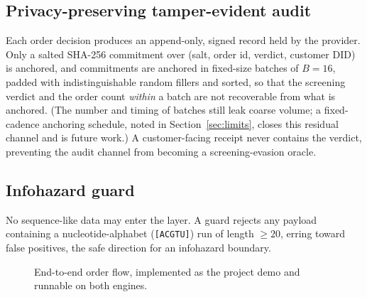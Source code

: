 \documentclass[conference]{IEEEtran}
\begin{document}
\subsection{Privacy-preserving tamper-evident audit}
Each order decision produces an append-only, signed record held by the provider. Only a salted
SHA-256 commitment over (salt, order id, verdict, customer DID) is anchored, and commitments are
anchored in fixed-size batches of $B=16$, padded with indistinguishable random fillers and
sorted, so that the screening verdict and the order count \textit{within} a batch are not
recoverable from what is anchored. (The number and timing of batches still leak coarse volume; a
fixed-cadence anchoring schedule, noted in Section~\ref{sec:limits}, closes this residual
channel and is future work.) A customer-facing receipt never contains the verdict, preventing the
audit channel from becoming a screening-evasion oracle.

\subsection{Infohazard guard}
No sequence-like data may enter the layer. A guard rejects any payload containing a
nucleotide-alphabet (\texttt{[ACGTU]}) run of length $\geq 20$, erring toward false positives,
the safe direction for an infohazard boundary.

\begin{figure}[t]
\centering
{}
\caption{End-to-end order flow, implemented as the project demo and runnable on both engines.}
\label{fig:flow}
\end{figure}
\end{document}
